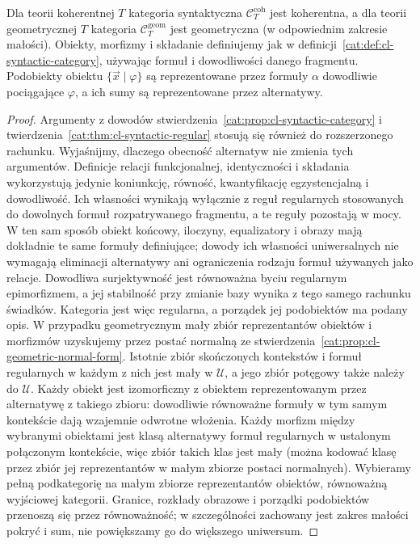 \begin{twierdzenie}\label{cat:thm:cl-geometric-syntactic}
Dla teorii koherentnej $T$ kategoria syntaktyczna $\mathcal C_T^{\mathrm{coh}}$ jest koherentna, a dla teorii geometrycznej $T$ kategoria $\mathcal C_T^{\mathrm{geom}}$ jest geometryczna (w odpowiednim zakresie małości). Obiekty, morfizmy i składanie definiujemy jak w definicji~\ref{cat:def:cl-syntactic-category}, używając formuł i dowodliwości danego fragmentu. Podobiekty obiektu $\{\vec x\mid\varphi\}$ są reprezentowane przez formuły $\alpha$ dowodliwie pociągające $\varphi$, a ich sumy są reprezentowane przez alternatywy.
\end{twierdzenie}
\begin{proof}
Argumenty z dowodów stwierdzenia~\ref{cat:prop:cl-syntactic-category} i twierdzenia~\ref{cat:thm:cl-syntactic-regular} stosują się również do rozszerzonego rachunku. Wyjaśnijmy, dlaczego obecność alternatyw nie zmienia tych argumentów. Definicje relacji funkcjonalnej, identyczności i składania wykorzystują jedynie koniunkcję, równość, kwantyfikację egzystencjalną i dowodliwość. Ich własności wynikają wyłącznie z reguł regularnych stosowanych do dowolnych formuł rozpatrywanego fragmentu, a te reguły pozostają w mocy. W ten sam sposób obiekt końcowy, iloczyny, equalizatory i obrazy mają dokładnie te same formuły definiujące; dowody ich własności uniwersalnych nie wymagają eliminacji alternatywy ani ograniczenia rodzaju formuł używanych jako relacje. Dowodliwa surjektywność jest równoważna byciu regularnym epimorfizmem, a jej stabilność przy zmianie bazy wynika z tego samego rachunku świadków. Kategoria jest więc regularna, a porządek jej podobiektów ma podany opis. W przypadku geometrycznym mały zbiór reprezentantów obiektów i morfizmów uzyskujemy przez postać normalną ze stwierdzenia~\ref{cat:prop:cl-geometric-normal-form}. Istotnie zbiór skończonych kontekstów i formuł regularnych w każdym z nich jest mały w $\mathcal U$, a jego zbiór potęgowy także należy do $\mathcal U$. Każdy obiekt jest izomorficzny z obiektem reprezentowanym przez alternatywę z takiego zbioru: dowodliwie równoważne formuły w tym samym kontekście dają wzajemnie odwrotne włożenia. Każdy morfizm między wybranymi obiektami jest klasą alternatywy formuł regularnych w ustalonym połączonym kontekście, więc zbiór takich klas jest mały (można kodować klasę przez zbiór jej reprezentantów w małym zbiorze postaci normalnych). Wybieramy pełną podkategorię na małym zbiorze reprezentantów obiektów, równoważną wyjściowej kategorii. Granice, rozkłady obrazowe i porządki podobiektów przenoszą się przez równoważność; w szczególności zachowany jest zakres małości pokryć i sum, nie powiększamy go do większego uniwersum.


\end{proof}
